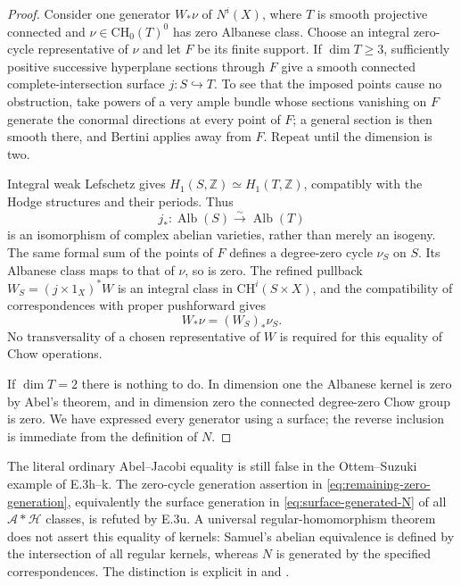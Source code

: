 \begin{proof}
Consider one generator $W_*\nu$ of $N^i(X)$, where
$T$ is smooth projective connected and $\nu\in
\mathrm{CH}_0(T)^0$ has zero Albanese class. Choose an
integral zero-cycle representative of $\nu$ and let $F$
be its finite support. If $\dim T\ge3$, sufficiently
positive successive hyperplane sections through $F$
give a smooth connected complete-intersection surface
$j:S\hookrightarrow T$. To see that the imposed points
cause no obstruction, take powers of a very ample bundle
whose sections vanishing on $F$ generate the conormal
directions at every point of $F$; a general section is
then smooth there, and Bertini applies away from $F$.
Repeat until the dimension is two.

Integral weak Lefschetz gives
$H_1(S,\mathbb Z)\simeq H_1(T,\mathbb Z)$, compatibly
with the Hodge structures and their periods. Thus
\[
 j_*:\operatorname{Alb}(S)\xrightarrow{\sim}
                         \operatorname{Alb}(T)
\]
is an isomorphism of complex abelian varieties, rather
than merely an isogeny. The same formal sum of the points
of $F$ defines a degree-zero cycle $\nu_S$ on $S$.
Its Albanese class maps to that of $\nu$, so is zero.
The refined pullback $W_S=(j\times1_X)^*W$ is an
integral class in $\mathrm{CH}^i(S\times X)$, and
the compatibility of correspondences with proper
pushforward gives
\[
                   W_*\nu=(W_S)_*\nu_S.
\]
No transversality of a chosen representative of $W$
is required for this equality of Chow operations.

If $\dim T=2$ there is nothing to do. In dimension one
the Albanese kernel is zero by Abel's theorem, and
in dimension zero the connected degree-zero Chow group
is zero. We have expressed every generator using a
surface; the reverse inclusion is immediate from the
definition of $N$.
\end{proof}

The literal ordinary Abel--Jacobi equality is still
false in the Ottem--Suzuki example of E.3h--k. The
zero-cycle generation assertion in
\eqref{eq:remaining-zero-generation}, equivalently the
surface generation in \eqref{eq:surface-generated-N}
of all $\mathcal A*\mathcal H$ classes, is refuted by E.3u.
A universal
regular-homomorphism theorem does not assert this
equality of kernels: Samuel's abelian equivalence is
defined by the intersection of all regular kernels,
whereas $N$ is generated by the specified correspondences.
The distinction is explicit in
\citet[Section 1.1, pp.~7--8]{cyBarbieriViale2001}
and \citet[Section 4.1, pp.~13--16]{cyHernandezPelaez2025}.
